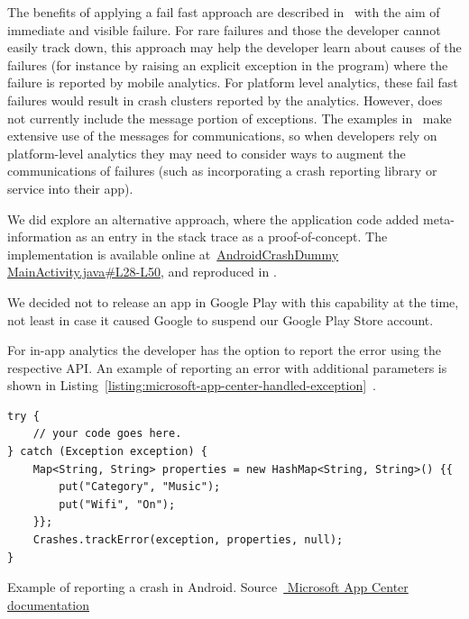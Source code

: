 The benefits of applying a fail fast approach are described in~ with the aim of immediate and visible failure. For rare failures and those the developer cannot easily track down, this approach may help the developer learn about causes of the failures (for instance by raising an explicit exception in the program) where the failure is reported by mobile analytics. For platform level analytics, these fail fast failures would result in crash clusters reported by the analytics. However,  does not currently include the message portion of exceptions. The examples in~ make extensive use of the messages for communications, so when developers rely on platform-level analytics they may need to consider ways to augment the communications of failures (such as incorporating a crash reporting library or service into their app).


\begin{kaobox}[frametitle=An alternative approach]
We did explore an alternative approach, where the application code added meta-information as an entry in the stack trace as a proof-of-concept. 
The implementation is available online at~\href{https://github.com/ISNIT0/AndroidCrashDummy/blob/cfa7f0817c436d7e657741e0a5d9a76644e5a898/app/src/main/java/com/example/user/androidtestapp/MainActivity.java\#L28-L50}{AndroidCrashDummy MainActivity.java\#L28-L50}, and reproduced in . 

We decided not to release an app in Google Play with this capability at the time, not least in case it caused Google to suspend our Google Play Store account. 
\end{kaobox}

For in-app analytics the developer has the option to report the error using the respective API. An example of reporting an error with additional parameters is shown in Listing~\ref{listing:microsoft-app-center-handled-exception}~.

\begin{listing}
\begin{verbatim}
try {
    // your code goes here.
} catch (Exception exception) {
    Map<String, String> properties = new HashMap<String, String>() {{
        put("Category", "Music");
        put("Wifi", "On");
    }};
    Crashes.trackError(exception, properties, null);
}
\end{verbatim}
\caption[Microsoft AppCenter: example of reporting a crash in Android]{Example of reporting a crash in Android.  Source~\href{https://docs.microsoft.com/en-us/appcenter/sdk/crashes/android}{ Microsoft App Center documentation}}
\label{listing:microsoft-app-center-handled-exception}
\end{listing}


